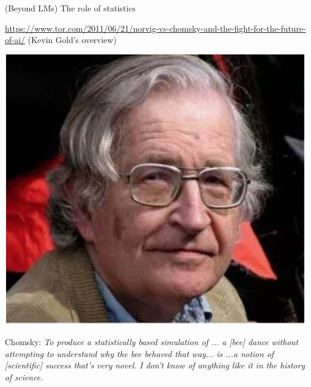 \documentclass{beamer}
\begin{document}
\begin{frame}{(Beyond LMs) The role of statistics}

  \begin{footnotesize}
    \url{https://www.tor.com/2011/06/21/norvig-vs-chomsky-and-the-fight-for-the-future-of-ai/} (Kevin Gold's overview)
  \end{footnotesize}

  \begin{center}
    \includegraphics[height=0.3\textheight]{figures/chomsky}
  \end{center}

  Chomsky: {\it To produce a statistically based simulation of ... a
    [bee] dance without attempting to understand why the bee behaved
    that way... is ...a notion of [scientific] success that's very
    novel. I don't know of anything like it in the history of
    science.}
\end{frame}
\end{document}
